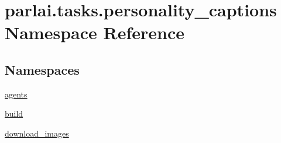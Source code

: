 \hypertarget{namespaceparlai_1_1tasks_1_1personality__captions}{}\section{parlai.\+tasks.\+personality\+\_\+captions Namespace Reference}
\label{namespaceparlai_1_1tasks_1_1personality__captions}
\subsection*{Namespaces}
\begin{DoxyCompactItemize}
\item 
 \hyperlink{namespaceparlai_1_1tasks_1_1personality__captions_1_1agents}{agents}
\item 
 \hyperlink{namespaceparlai_1_1tasks_1_1personality__captions_1_1build}{build}
\item 
 \hyperlink{namespaceparlai_1_1tasks_1_1personality__captions_1_1download__images}{download\+\_\+images}
\end{DoxyCompactItemize}
